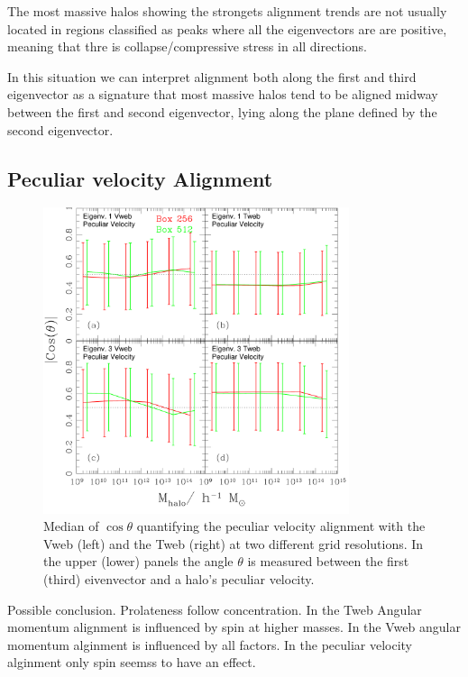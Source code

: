 \documentclass[usenatbib]{mn2e}
\begin{document}
The most massive halos showing the strongets alignment trends are not
usually located in regions classified as peaks where all the
eigenvectors are are positive, meaning that thre is
collapse/compressive stress in all directions. 

In this situation we
can interpret alignment both along the first and third eigenvector as
a signature that most massive halos tend to be aligned midway between
the first and second eigenvector, lying along the plane defined by the
second eigenvector.







\subsection{Peculiar velocity Alignment}

\begin{figure}
\includegraphics[width=0.80\textwidth]{Fig4.pdf}
\caption{Median of $\cos\theta$ quantifying the peculiar velocity
  alignment with the Vweb (left) and the Tweb (right) at two different
  grid resolutions. In the upper (lower)  panels the angle $\theta$ is
  measured between the first (third) eivenvector and a halo's peculiar
  velocity.} 
\end{figure}

Possible conclusion. Prolateness follow concentration. In the Tweb
Angular momentum alignment is influenced by spin at higher masses. In
the Vweb angular momentum alginment is influenced by all factors. In
the peculiar velocity alginment only spin seemss to have an effect. 
\end{document}
